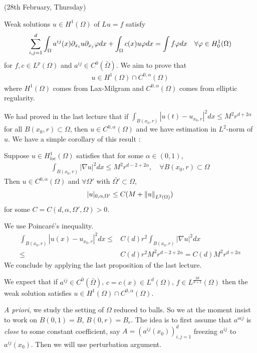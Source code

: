 \documentclass[12pt,a4paper]{article}
\newenvironment{proof}
{\begin{changemargin}{0.5cm}{0.5cm} 
	}%
	{\end{changemargin}
}
\newenvironment{p}
{\begin{proof} 
	}%
	{\end{proof}
}
\begin{document}
\newday

(28th February, Thursday)
\s

Weak solutions $u\in H^1(\Omega)$ of $Lu = f$ satisfy
\begin{align*}
\sum_{i,j=1}^d \int_{\Omega} a^{ij}(x) \partial_{x_i} u \partial_{x_j} \varphi dx + \int_{\Omega} c(x) u\varphi dx = \int f\varphi dx \quad \forall \varphi \in H_0^1(\Omega)
\end{align*}
for $f,c \in L^p(\Omega)$ and $a^{ij} \in C^0(\bar{\Omega})$. We aim to prove that
\begin{align*}
u\in H^1(\Omega) \cap C^{0, \alpha}(\Omega)
\end{align*}
where $H^1(\Omega)$ comes from Lax-Milgram and $C^{0, \alpha}(\Omega)$ comes from elliptic regularity. 

\quad We had proved in the last lecture that if $\int_{B(x_0, r)} |u(t) - u_{x_0, r}|^2 dx \leq M^2 r^{d+2\alpha}$ for all $B(x_0, r) \subset \Omega$, then $u\in C^{0, \alpha}(\Omega)$ and we have estimation in $L^2$-norm of $u$. We have a simple corollary of this result :
\s

\corr Suppose $u\in H^1_{loc} (\Omega)$ satisfies that for some $\alpha \in (0,1)$,
\begin{align*}
\int_{B(x_0, r)} |\nabla u|^2 dx \leq M^2 r^{d-2 + 2\alpha}, \quad \forall B(x_0, r) \subset \Omega
\end{align*}
Then $u\in C^{0, \alpha}(\Omega)$ and $\forall \Omega'$ with $\bar{\Omega'} \subset \Omega$,
\begin{align*}
|u|_{0, \alpha, \Omega'} \leq C(M + \snorms{u}{L^2(\Omega)})
\end{align*}
for some $C = C(d, \alpha, \Omega', \Omega) >0$.
\begin{p}
\pf We use Poincar\'e's inequality.
\begin{align*}
\int_{B(x_0, r)} |u(x) - u_{x_0, r}|^2 dx \leq & C(d) r^2 \int_{B(x_0, r)} |\nabla u|^2 dx \\
\leq & C(d) r^2 M^2 r^{d-2+2\alpha} = C(d) M^2 r^{d+ 2\alpha}
\end{align*}
We conclude by applying the last proposition of the last lecture.

\eop 
\end{p}
\s

We expect that if $a^{ij} \in C^0(\bar{\Omega})$, $c =c(x) \in L^d(\Omega)$, $f\in L^{\frac{2d}{d+2}}(\Omega)$ then the weak solution satisfies $u\in H^1(\Omega) \cap C^{0, \alpha}(\Omega)$.
\s

\textit{A priori}, we study the setting of $\Omega$ reduced to balls. So we at the moment insist to work on $B(0, 1) =B$, $B(0, r)=B_r$. The idea is to first assume that $a^{oij}$ is \emph{close} to some constant coefficient, say $A = (a^{ij}(x_0))_{i,j=1}^d$ freezing $a^{ij}$ to $a^{ij}(x_0)$. Then we will use perturbation argument.
\end{document}
